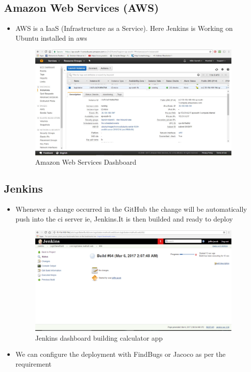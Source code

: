 \documentclass[12pt,a4paper,oneside]{report}
\begin{document}
{\subsection{Amazon Web Services (AWS)}
\begin{itemize}
\item \par AWS is a IaaS (Infrastructure as a Service).
Here Jenkins is Working on Ubuntu installed in aws 
\begin{figure}[h]
\begin{center}
\includegraphics[scale=.47]{aws.png}
\caption{Amazon Web Services Dashboard}
\label{Amazon Web Services Dashboard}
\end{center}
\end{figure}
\end{itemize}
\pagebreak
\newpage
\subsection{Jenkins}
\begin{itemize}

\item \par Whenever a change occurred in the GitHub the change will be automatically push into the ci server ie, Jenkins.It is then builded and ready to deploy
\begin{figure}[h]
\begin{center}
\includegraphics[scale=.47]{jnks.png}
\caption{Jenkins dashboard building calculator app}
\label{Jenkins dashboard building calculator app}
\end{center}
\end{figure}
\item \par We can configure the deployment with FindBugs or Jacoco as per the requirement
\newpage

\end{itemize}}
\end{document}
